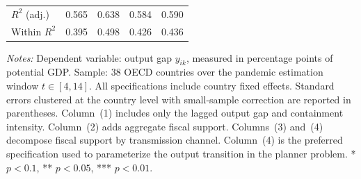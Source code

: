 \begin{table}[H]
\begin{tabular}{@{} l c c c c @{}}
$R^2$ (adj.) & 0.565 & 0.638 & 0.584 & 0.590 \\
Within $R^2$ & 0.395 & 0.498 & 0.426 & 0.436 \\
\bottomrule
\end{tabular}
\vspace{4pt}
\parbox{\textwidth}{\scriptsize\textit{Notes:} Dependent variable: output gap $y_{ik}$, measured in percentage points of potential GDP. Sample: 38 OECD countries over the pandemic estimation window $t \in [4,14]$. All specifications include country fixed effects. Standard errors clustered at the country level with small-sample correction are reported in parentheses. Column~(1) includes only the lagged output gap and containment intensity. Column~(2) adds aggregate fiscal support. Columns~(3) and~(4) decompose fiscal support by transmission channel. Column~(4) is the preferred specification used to parameterize the output transition in the planner problem. * $p<0.1$, ** $p<0.05$, *** $p<0.01$.}
\end{table}
